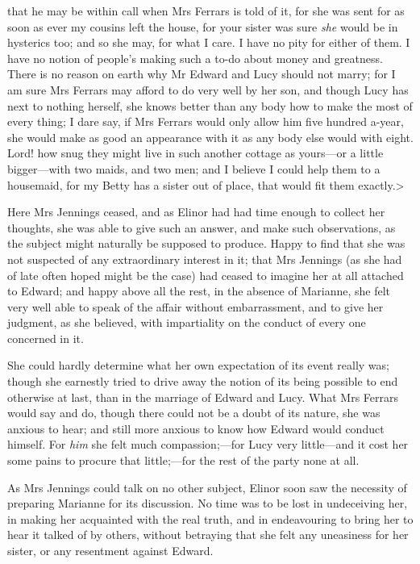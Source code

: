 that he may be within call when Mrs Ferrars is told of it, for she was sent for as soon as ever my cousins left the house, for your sister was sure \textit{she} would be in hysterics too; and so she may, for what I care. I have no pity for either of them. I have no notion of people's making such a to-do about money and greatness. There is no reason on earth why Mr Edward and Lucy should not marry; for I am sure Mrs Ferrars may afford to do very well by her son, and though Lucy has next to nothing herself, she knows better than any body how to make the most of every thing; I dare say, if Mrs Ferrars would only allow him five hundred a-year, she would make as good an appearance with it as any body else would with eight. Lord! how snug they might live in such another cottage as yours—or a little bigger—with two maids, and two men; and I believe I could help them to a housemaid, for my Betty has a sister out of place, that would fit them exactly.>

Here Mrs Jennings ceased, and as Elinor had had time enough to collect her thoughts, she was able to give such an answer, and make such observations, as the subject might naturally be supposed to produce. Happy to find that she was not suspected of any extraordinary interest in it; that Mrs Jennings (as she had of late often hoped might be the case) had ceased to imagine her at all attached to Edward; and happy above all the rest, in the absence of Marianne, she felt very well able to speak of the affair without embarrassment, and to give her judgment, as she believed, with impartiality on the conduct of every one concerned in it.

She could hardly determine what her own expectation of its event really was; though she earnestly tried to drive away the notion of its being possible to end otherwise at last, than in the marriage of Edward and Lucy. What Mrs Ferrars would say and do, though there could not be a doubt of its nature, she was anxious to hear; and still more anxious to know how Edward would conduct himself. For \textit{him} she felt much compassion;—for Lucy very little—and it cost her some pains to procure that little;—for the rest of the party none at all.

As Mrs Jennings could talk on no other subject, Elinor soon saw the necessity of preparing Marianne for its discussion. No time was to be lost in undeceiving her, in making her acquainted with the real truth, and in endeavouring to bring her to hear it talked of by others, without betraying that she felt any uneasiness for her sister, or any resentment against Edward.

